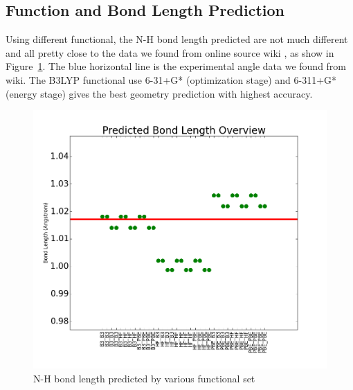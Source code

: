 \documentclass{article}
\begin{document}
\subsection{Function and Bond Length Prediction}
Using different functional, the N-H bond length predicted are not much different and all pretty close to the data we found from online source wiki \cite{Wiki}, as show in Figure~\ref{fig:Bond Length}. The blue horizontal line is the experimental angle data we found from wiki. The B3LYP functional use 6-31+G* (optimization stage) and 6-311+G* (energy stage) gives the best geometry prediction with highest accuracy.
\begin{figure}[ht]
\includegraphics[width=1\textwidth]{Bond_Length.png}
\caption{N-H bond length predicted by various functional set}
\label{fig:Bond Length}
\end{figure}
\end{document}
